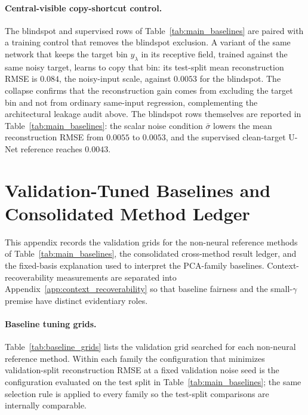 \documentclass[twocolumn]{aastex7}
\begin{document}
\paragraph{Central-visible copy-shortcut control.}
The blindspot and supervised rows of Table~\ref{tab:main_baselines} are paired with a training control that removes the blindspot exclusion. A variant of the same network that keeps the target bin $y_{\lambda}$ in its receptive field, trained against the same noisy target, learns to copy that bin: its test-split mean reconstruction RMSE is $0.084$, the noisy-input scale, against $0.0053$ for the blindspot. The collapse confirms that the reconstruction gain comes from excluding the target bin and not from ordinary same-input regression, complementing the architectural leakage audit above. The blindspot rows themselves are reported in Table~\ref{tab:main_baselines}: the scalar noise condition $\bar{\sigma}$ lowers the mean reconstruction RMSE from $0.0055$ to $0.0053$, and the supervised clean-target U-Net reference reaches $0.0043$.

\section{Validation-Tuned Baselines and Consolidated Method Ledger}
\label{app:controls_gamma}

This appendix records the validation grids for the non-neural reference methods of Table~\ref{tab:main_baselines}, the consolidated cross-method result ledger, and the fixed-basis explanation used to interpret the PCA-family baselines. Context-recoverability measurements are separated into Appendix~\ref{app:context_recoverability} so that baseline fairness and the small-$\gamma$ premise have distinct evidentiary roles.

\paragraph{Baseline tuning grids.}
Table~\ref{tab:baseline_grids} lists the validation grid searched for each non-neural reference method. Within each family the configuration that minimizes validation-split reconstruction RMSE at a fixed validation noise seed is the configuration evaluated on the test split in Table~\ref{tab:main_baselines}; the same selection rule is applied to every family so the test-split comparisons are internally comparable.
\end{document}

